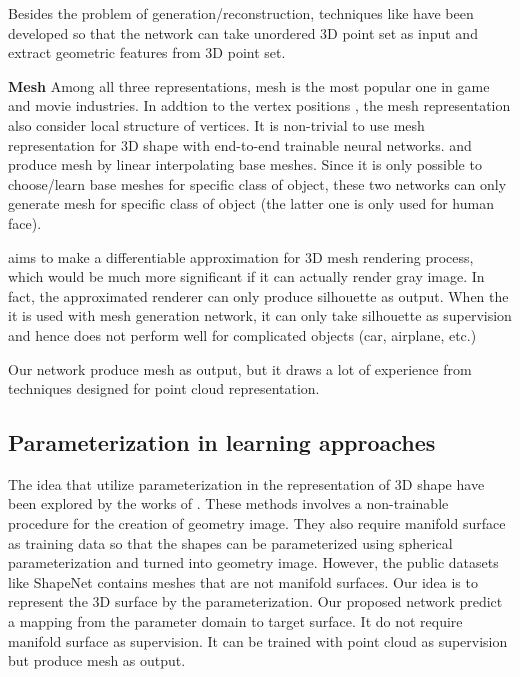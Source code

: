 Besides the problem of generation/reconstruction, techniques like \cite{PointNet,NIPS2017_7095,pointcnn} have been developed so that the network can take unordered 3D point set as input and extract geometric features from 3D point set.

\noindent\textbf{Mesh}
Among all three representations, mesh is the most popular one in game and movie industries. In addtion to the vertex positions , the mesh representation also consider local structure of vertices. It is non-trivial to use mesh representation for 3D shape with end-to-end trainable neural networks. \cite{img2mesh} and \cite{endface} produce mesh by linear interpolating base meshes. Since it is only possible to choose/learn base meshes for specific class of object, these two networks can only generate mesh for specific class of object (the latter one is only used for human face).

\cite{3Drender} aims to make a differentiable approximation for 3D mesh rendering process, which would be much more significant if it can actually render gray image. In fact, the approximated renderer can only produce silhouette as output. When the it is used with mesh generation network, it can only take silhouette as supervision and hence does not perform well for complicated objects (car, airplane, etc.)

Our network produce mesh as output, but it draws a lot of experience from techniques designed for point cloud representation.

\subsection{Parameterization in learning approaches}
 The idea that utilize parameterization in the representation of 3D shape have been explored by the works of \cite{surfnet,geoimg}. These methods involves a non-trainable procedure for the creation of geometry image. They also require manifold surface as training data so that the shapes can be parameterized using spherical parameterization and turned into geometry image. However, the public datasets like ShapeNet\cite{shapenetdata} contains meshes that are not manifold surfaces. Our idea is to represent the 3D surface by the parameterization. Our proposed network predict a mapping from the parameter domain to target surface. It do not require manifold surface as supervision. It can be trained with point cloud as supervision but produce mesh as output.
